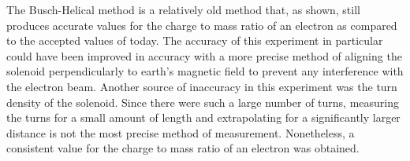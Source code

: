 \documentclass[%
 aip,
 amsmath,amssymb,
 reprint,%
floatfix,
]{revtex4-1}
\begin{document}
The Busch-Helical method is a relatively old method that, as shown, still produces accurate values for the charge to mass ratio of an electron as compared to the accepted values of today. The accuracy of this experiment in particular could have been improved in accuracy with a more precise method of aligning the solenoid perpendicularly to earth's magnetic field to prevent any interference with the electron beam. Another source of inaccuracy in this experiment was the turn density of the solenoid. Since there were such a large number of turns, measuring the turns for a small amount of length and extrapolating for a significantly larger distance is not the most precise method of measurement. Nonetheless, a consistent value for the charge to mass ratio of an electron was obtained.

\nocite{*}
\end{document}
